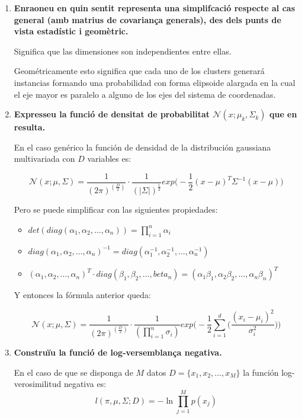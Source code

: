 \documentclass[a5paper]{article}
\begin{document}
\begin{enumerate}
\item \textbf{Enraoneu en quin sentit representa una simplifcació respecte al cas general (amb matrius de
covariança generals), des dels punts de vista estadístic i geomètric.
}

Significa que las dimensiones son independientes entre ellas.

Geométricamente esto significa que cada uno de los clusters generará instancias formando una probabilidad con forma elipsoide alargada en la cual el eje mayor es paralelo a alguno de los ejes del sistema de coordenadas.
\item \textbf{Expresseu la funció de densitat de probabilitat $\mathcal{N}(x; \mu_k, \Sigma_k)$ que en resulta.
}

En el caso genérico la función de densidad de la distribución gaussiana multivariada con $D$ variables es:

\begin{equation*}
\mathcal{N}(x;\mu,\Sigma) = \frac{1}{(2\pi)^{(\frac{D}{2})}} \cdot \frac{1}{(|\Sigma|)^{\frac{1}{2}}} exp\Bigg( -\frac{1}{2} (x - \mu)^T\Sigma^{-1}(x - \mu) \Bigg)
\end{equation*}

Pero se puede simplificar con las siguientes propiedades:
\begin{itemize}
\item $det( diag(\alpha_1,\alpha_2, \dots, \alpha_n) ) = \prod_{i = 1}^n \alpha_i$
\item $diag(\alpha_1, \alpha_2, \dots, \alpha_n)^{-1} = diag(\alpha_1^{-1}, \alpha_2^{-1}, \dots, \alpha_n^{-1})$
\item $(\alpha_1,\alpha_2, \dots, \alpha_n)^T \cdot diag(\beta_1,\beta_2, \dots, beta_n) = (\alpha_1\beta_1, \alpha_2\beta_2, \dots, \alpha_n\beta_n)^T$
\end{itemize}

Y entonces la fórmula anterior queda:

\begin{equation*}
\mathcal{N}(x;\mu,\Sigma) = \frac{1}{(2\pi)^{(\frac{D}{2})}} \cdot \frac{1}{(\prod_{i = 1}^n \sigma_i)} exp\Bigg( -\frac{1}{2} \sum_{i = 1}^{d} \Big( \frac{(x_i - \mu_i)^2}{\sigma_i^2} \Big) \Bigg)
\end{equation*}
\item \textbf{Construïu la funció de log-versemblança negativa.
}

En el caso de que se disponga de $M$ datos $D = \{x_1, x_2, \dots, x_M\}$ la función log-verosimilitud negativa es:
\begin{equation*}
l(\pi, \mu, \Sigma; D) = -\ln \prod_{j = 1}^{M} p(x_j) 
\end{equation*}


\end{enumerate}
\end{document}
